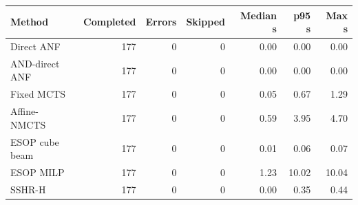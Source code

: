 \begin{tabular}{lrrrrrr}
\toprule
Method & Completed & Errors & Skipped & Median s & p95 s & Max s \\
\midrule
Direct ANF & 177 & 0 & 0 & 0.00 & 0.00 & 0.00 \\
AND-direct ANF & 177 & 0 & 0 & 0.00 & 0.00 & 0.00 \\
Fixed MCTS & 177 & 0 & 0 & 0.05 & 0.67 & 1.29 \\
Affine-NMCTS & 177 & 0 & 0 & 0.59 & 3.95 & 4.70 \\
ESOP cube beam & 177 & 0 & 0 & 0.01 & 0.06 & 0.07 \\
ESOP MILP & 177 & 0 & 0 & 1.23 & 10.02 & 10.04 \\
SSHR-H & 177 & 0 & 0 & 0.00 & 0.35 & 0.44 \\
\bottomrule
\end{tabular}
